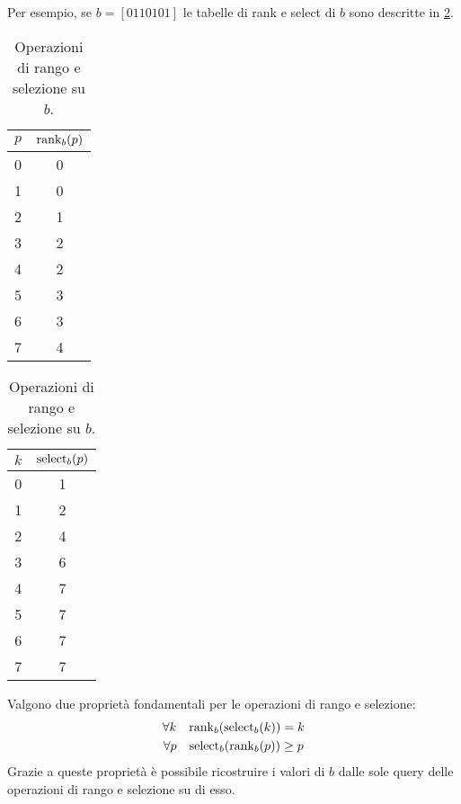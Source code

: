 Per esempio, se $b = [0 1 1 0 1 0 1]$ le tabelle di rank e select di $b$ sono descritte in \cref{table:rank_sel}.
\begin{table}[ht]
	\centering
	\begin{subtable}{0.45\textwidth}
		\centering
		\begin{tabular}{c|c}
			$p$ & $\rank_b(p)$ \\ \hline
			0   & 0            \\
			1   & 0            \\
			2   & 1            \\
			3   & 2            \\
			4   & 2            \\
			5   & 3            \\
			6   & 3            \\
			7   & 4
		\end{tabular}
		\caption{$\rank_b(p)$}
	\end{subtable}
	\begin{subtable}{0.45\textwidth}
		\centering
		\begin{tabular}{c|c}
			$k$ & $\select_b(p)$ \\ \hline
			0   & 1              \\
			1   & 2              \\
			2   & 4              \\
			3   & 6              \\
			4   & 7              \\
			5   & 7              \\
			6   & 7              \\
			7   & 7              \\
		\end{tabular}
		\caption{$\select_b(p)$}
	\end{subtable}
	\caption{Operazioni di rango e selezione su $b$.}
	\label{table:rank_sel}
\end{table}

Valgono due proprietà fondamentali per le operazioni di rango e selezione:
\begin{gather*}
	\forall k\quad \mathrm{rank}_b(\mathrm{select}_b(k)) = k \\
	\forall p\quad \mathrm{select}_b(\mathrm{rank}_b(p)) \geq p
\end{gather*}
Grazie a queste proprietà è possibile ricostruire i valori di $b$ dalle sole query delle operazioni di rango e selezione su di esso.



